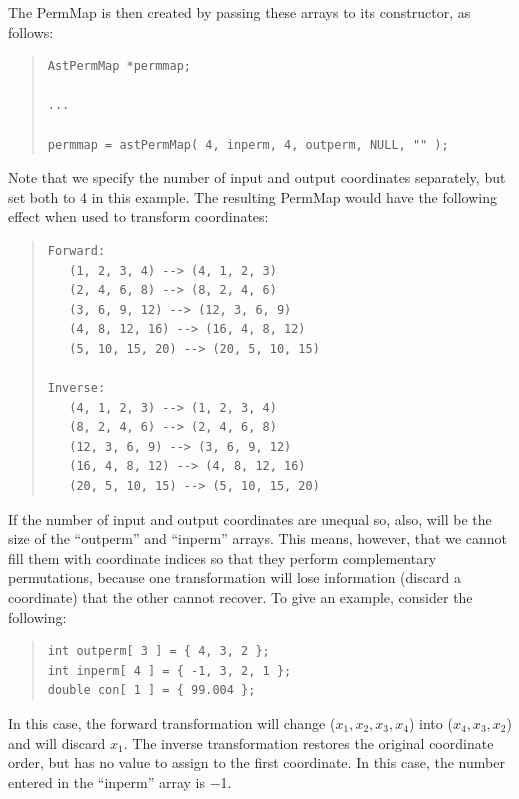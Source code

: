 \documentclass[twoside,11pt]{article}
\begin{document}
The PermMap is then created by passing these arrays to its
constructor, as follows:

\begin{quote}
\small
\begin{verbatim}
AstPermMap *permmap;

...

permmap = astPermMap( 4, inperm, 4, outperm, NULL, "" );
\end{verbatim}
\normalsize
\end{quote}

Note that we specify the number of input and output coordinates
separately, but set both to 4 in this example. The resulting PermMap
would have the following effect when used to transform coordinates:

\begin{quote}
\begin{verbatim}
Forward:
   (1, 2, 3, 4) --> (4, 1, 2, 3)
   (2, 4, 6, 8) --> (8, 2, 4, 6)
   (3, 6, 9, 12) --> (12, 3, 6, 9)
   (4, 8, 12, 16) --> (16, 4, 8, 12)
   (5, 10, 15, 20) --> (20, 5, 10, 15)

Inverse:
   (4, 1, 2, 3) --> (1, 2, 3, 4)
   (8, 2, 4, 6) --> (2, 4, 6, 8)
   (12, 3, 6, 9) --> (3, 6, 9, 12)
   (16, 4, 8, 12) --> (4, 8, 12, 16)
   (20, 5, 10, 15) --> (5, 10, 15, 20)
\end{verbatim}
\end{quote}

If the number of input and output coordinates are unequal so, also,
will be the size of the ``outperm'' and ``inperm'' arrays. This means,
however, that we cannot fill them with coordinate indices so that they
perform complementary permutations, because one transformation will
lose information (discard a coordinate) that the other cannot recover.
To give an example, consider the following:

\begin{quote}
\small
\begin{verbatim}
int outperm[ 3 ] = { 4, 3, 2 };
int inperm[ 4 ] = { -1, 3, 2, 1 };
double con[ 1 ] = { 99.004 };
\end{verbatim}
\normalsize
\end{quote}

In this case, the forward transformation will change
($x_1,x_2,x_3,x_4$) into ($x_4,x_3,x_2$) and will discard $x_1$. The
inverse transformation restores the original coordinate order, but has
no value to assign to the first coordinate. In this case, the number
entered in the ``inperm'' array is $-$1.
\end{document}
